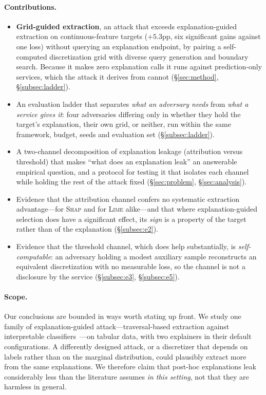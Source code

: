 \documentclass[sigconf,anonymous,review]{acmart}
\begin{document}
\paragraph{Contributions.}
\begin{itemize}
  \item \textbf{Grid-guided extraction}, an attack that exceeds explanation-guided extraction on
  continuous-feature targets ($+5.3$pp, six significant gains against one loss) without querying an
  explanation endpoint, by pairing a self-computed discretization grid with diverse query generation
  and boundary search. Because it makes zero explanation calls it runs against prediction-only
  services, which the attack it derives from cannot (\S\ref{sec:method}, \S\ref{subsec:ladder}).
  \item An evaluation ladder that separates \emph{what an adversary needs} from \emph{what a service
  gives it}: four adversaries differing only in whether they hold the target's explanation, their own
  grid, or neither, run within the same framework, budget, seeds and evaluation set
  (\S\ref{subsec:ladder}).
  \item A two-channel decomposition of explanation leakage (attribution versus threshold) that makes
  ``what does an explanation leak'' an answerable empirical question, and a protocol for testing it
  that isolates each channel while holding the rest of the attack fixed (\S\ref{sec:problem},
  \S\ref{sec:analysis}).
  \item Evidence that the attribution channel confers no systematic extraction advantage---for
  \textsc{Shap} and for \textsc{Lime} alike---and that where explanation-guided selection does have a
  significant effect, its \emph{sign} is a property of the target rather than of the explanation
  (\S\ref{subsec:e2}).
  \item Evidence that the threshold channel, which does help substantially, is
  \emph{self-computable}: an adversary holding a modest auxiliary sample reconstructs an equivalent
  discretization with no measurable loss, so the channel is not a disclosure by the service
  (\S\ref{subsec:e3}, \S\ref{subsec:e5}).
\end{itemize}

\paragraph{Scope.} Our conclusions are bounded in ways worth stating up front. We study one family of
explanation-guided attack---traversal-based extraction against interpretable
classifiers~\cite{oksuz2024autolycus}---on tabular data, with two explainers in their default
configurations. A differently designed attack, or a discretizer that depends on labels rather than on
the marginal distribution, could plausibly extract more from the same explanations. We therefore claim
that post-hoc explanations leak considerably less than the literature assumes \emph{in this setting},
not that they are harmless in general.
\end{document}
